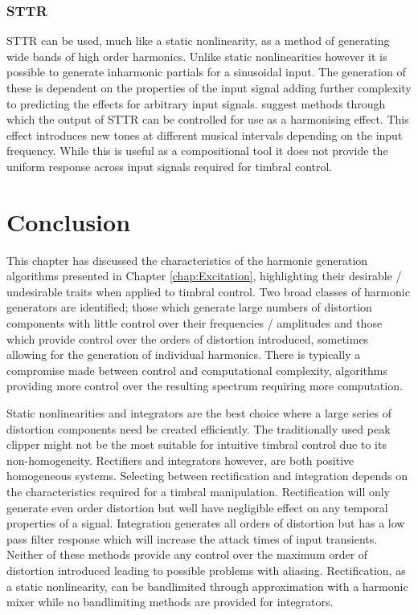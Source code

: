 		\subsubsection*{STTR}
			STTR can be used, much like a static nonlinearity, as a method of generating wide bands of high
			order harmonics. Unlike static nonlinearities however it is possible to generate inharmonic
			partials for a sinusoidal input. The generation of these is dependent on the properties of the
			input signal adding further complexity to predicting the effects for arbitrary input signals.
			\citet{kim2015harmonizing} suggest methods through which the output of STTR can be controlled for
			use as a harmonising effect. This effect introduces new tones at different musical intervals
			depending on the input frequency. While this is useful as a compositional tool it does not provide
			the uniform response across input signals required for timbral control.

\section{Conclusion}
	This chapter has discussed the characteristics of the harmonic generation algorithms presented in Chapter
	\ref{chap:Excitation}, highlighting their desirable / undesirable traits when applied to timbral control. Two
	broad classes of harmonic generators are identified; those which generate large numbers of distortion components
	with little control over their frequencies / amplitudes and those which provide control over the orders of
	distortion introduced, sometimes allowing for the generation of individual harmonics. There is typically a
	compromise made between control and computational complexity, algorithms providing more control over the resulting
	spectrum requiring more computation.

	Static nonlinearities and integrators are the best choice where a large series of distortion components need be
	created efficiently. The traditionally used peak clipper might not be the most suitable for intuitive timbral
	control due to its non-homogeneity. Rectifiers and integrators however, are both positive homogeneous systems.
	Selecting between rectification and integration depends on the characteristics required for a timbral manipulation.
	Rectification will only generate even order distortion but well have negligible effect on any temporal properties of
	a signal. Integration generates all orders of distortion but has a low pass filter response which will increase the
	attack times of input transients. Neither of these methods provide any control over the maximum order of distortion
	introduced leading to possible problems with aliasing. Rectification, as a static nonlinearity, can be bandlimited
	through approximation with a harmonic mixer while no bandlimiting methods are provided for integrators.


